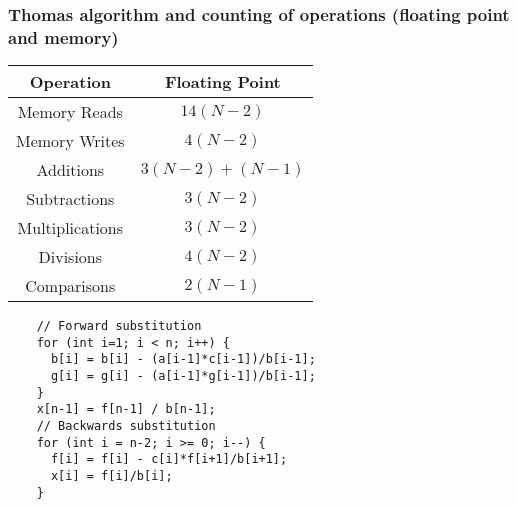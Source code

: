 \documentclass{beamer}
\begin{document}
\begin{frame}
\frametitle{Thomas algorithm and counting of operations (floating point and memory)}

\begin{block}{}



{\footnotesize
\begin{tabular}{cc}
\hline
\multicolumn{1}{c}{ Operation } & \multicolumn{1}{c}{ Floating Point } \\
\hline
Memory Reads    & $14(N-2)$        \\
Memory Writes   & $4(N-2)$         \\
Additions       & $3(N-2) + (N-1)$ \\
Subtractions    & $3(N-2)$         \\
Multiplications & $3(N-2)$         \\
Divisions       & $4(N-2)$         \\
Comparisons     & $2(N-1)$         \\
\hline
\end{tabular}
}

\noindent
\end{block}

\begin{block}{}
\begin{verbatim}
    // Forward substitution                                                                       
    for (int i=1; i < n; i++) {
      b[i] = b[i] - (a[i-1]*c[i-1])/b[i-1];
      g[i] = g[i] - (a[i-1]*g[i-1])/b[i-1];
    }
    x[n-1] = f[n-1] / b[n-1];
    // Backwards substitution                                                           
    for (int i = n-2; i >= 0; i--) {
      f[i] = f[i] - c[i]*f[i+1]/b[i+1];
      x[i] = f[i]/b[i];
    }
\end{verbatim}
\end{block}
\end{frame}
\end{document}
